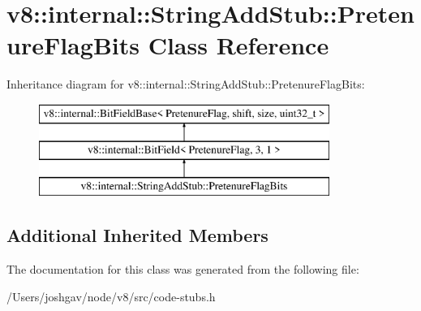 \hypertarget{classv8_1_1internal_1_1_string_add_stub_1_1_pretenure_flag_bits}{}\section{v8\+:\+:internal\+:\+:String\+Add\+Stub\+:\+:Pretenure\+Flag\+Bits Class Reference}
\label{classv8_1_1internal_1_1_string_add_stub_1_1_pretenure_flag_bits}
Inheritance diagram for v8\+:\+:internal\+:\+:String\+Add\+Stub\+:\+:Pretenure\+Flag\+Bits\+:\begin{figure}[H]
\begin{center}
\leavevmode
\includegraphics[height=3.000000cm]{classv8_1_1internal_1_1_string_add_stub_1_1_pretenure_flag_bits}
\end{center}
\end{figure}
\subsection*{Additional Inherited Members}


The documentation for this class was generated from the following file\+:\begin{DoxyCompactItemize}
\item 
/\+Users/joshgav/node/v8/src/code-\/stubs.\+h\end{DoxyCompactItemize}
